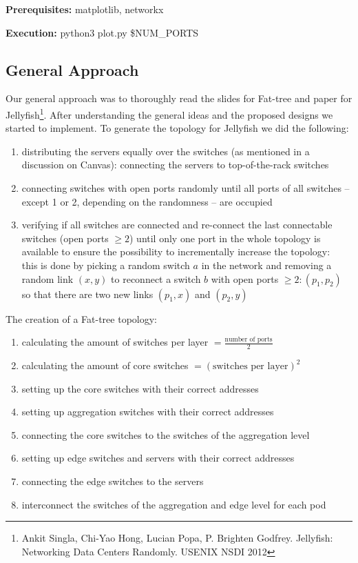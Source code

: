 \documentclass[a4paper,11pt]{article}
\begin{document}
\textbf{Prerequisites:} matplotlib, networkx

\textbf{Execution:} python3 plot.py \$NUM\_PORTS

\subsection{General Approach}
Our general approach was to thoroughly read the slides for Fat-tree and paper for Jellyfish\footnote{Ankit Singla, Chi-Yao Hong, Lucian Popa, P. Brighten Godfrey. Jellyfish: Networking Data Centers Randomly. USENIX NSDI 2012}.
After understanding the general ideas and the proposed designs we started to implement.
To generate the topology for Jellyfish we did the following:
\begin{enumerate}
    \item distributing the servers equally over the switches (as mentioned in a discussion on Canvas): connecting the servers to top-of-the-rack switches
    \item connecting switches with open ports randomly until all ports of all switches -- except 1 or 2, depending on the randomness -- are occupied
    \item verifying if all switches are connected and re-connect the last connectable switches (open ports $\geq 2$) until only one port in the whole topology is available to ensure the possibility to incrementally increase the topology:\\
    this is done by picking a random switch $a$ in the network and removing a random link $(x,y)$ to reconnect a switch $b$ with open ports $\geq 2: (p_1, p_2)$ so that there are two new links $(p_1, x)$ and $(p_2, y)$
\end{enumerate}

The creation of a Fat-tree topology:
\begin{enumerate}
    \item calculating the amount of switches per layer $=\frac{\textrm{number of ports}}{2}$
    \item calculating the amount of core switches $=(\textrm{switches per layer})^2$
    \item setting up the core switches with their correct addresses
    \item setting up aggregation switches with their correct addresses
    \item connecting the core switches to the switches of the aggregation level
    \item setting up edge switches and servers with their correct addresses
    \item connecting the edge switches to the servers
    \item interconnect the switches of the aggregation and edge level for each pod
\end{enumerate}
\end{document}
